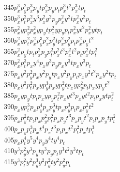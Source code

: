 \begin{tabbing}
345\>$p_x^3 p_y^2       $\>$p_x^3 p_yt        $\>$p_x^3 p_yp_t      $\>$p_x^3 t  ^2       $\>$p_x^3 t  p_t      $\\
350\>$p_x^3 p_t^2       $\>$p_x^2 y  ^3       $\>$p_x^2 y  ^2 p_y   $\>$p_x^2 y  ^2 t     $\>$p_x^2 y  ^2 p_t   $\\
355\>$p_x^2 y  p_y^2    $\>$p_x^2 y  p_yt     $\>$p_x^2 y  p_yp_t   $\>$p_x^2 y  t  ^2    $\>$p_x^2 y  t  p_t   $\\
360\>$p_x^2 y  p_t^2    $\>$p_x^2 p_y^3       $\>$p_x^2 p_y^2 t     $\>$p_x^2 p_y^2 p_t   $\>$p_x^2 p_yt  ^2    $\\
365\>$p_x^2 p_yt  p_t   $\>$p_x^2 p_yp_t^2    $\>$p_x^2 t  ^3       $\>$p_x^2 t  ^2 p_t   $\>$p_x^2 t  p_t^2    $\\
370\>$p_x^2 p_t^3       $\>$p_xy  ^4          $\>$p_xy  ^3 p_y      $\>$p_xy  ^3 t        $\>$p_xy  ^3 p_t      $\\
375\>$p_xy  ^2 p_y^2    $\>$p_xy  ^2 p_yt     $\>$p_xy  ^2 p_yp_t   $\>$p_xy  ^2 t  ^2    $\>$p_xy  ^2 t  p_t   $\\
380\>$p_xy  ^2 p_t^2    $\>$p_xy  p_y^3       $\>$p_xy  p_y^2 t     $\>$p_xy  p_y^2 p_t   $\>$p_xy  p_yt  ^2    $\\
385\>$p_xy  p_yt  p_t   $\>$p_xy  p_yp_t^2    $\>$p_xy  t  ^3       $\>$p_xy  t  ^2 p_t   $\>$p_xy  t  p_t^2    $\\
390\>$p_xy  p_t^3       $\>$p_xp_y^4          $\>$p_xp_y^3 t        $\>$p_xp_y^3 p_t      $\>$p_xp_y^2 t  ^2    $\\
395\>$p_xp_y^2 t  p_t   $\>$p_xp_y^2 p_t^2    $\>$p_xp_yt  ^3       $\>$p_xp_yt  ^2 p_t   $\>$p_xp_yt  p_t^2    $\\
400\>$p_xp_yp_t^3       $\>$p_xt  ^4          $\>$p_xt  ^3 p_t      $\>$p_xt  ^2 p_t^2    $\>$p_xt  p_t^3       $\\
405\>$p_xp_t^4          $\>$y  ^5             $\>$y  ^4 p_y         $\>$y  ^4 t           $\>$y  ^4 p_t         $\\
410\>$y  ^3 p_y^2       $\>$y  ^3 p_yt        $\>$y  ^3 p_yp_t      $\>$y  ^3 t  ^2       $\>$y  ^3 t  p_t      $\\
415\>$y  ^3 p_t^2       $\>$y  ^2 p_y^3       $\>$y  ^2 p_y^2 t     $\>$y  ^2 p_y^2 p_t   $\>

\end{tabbing}
